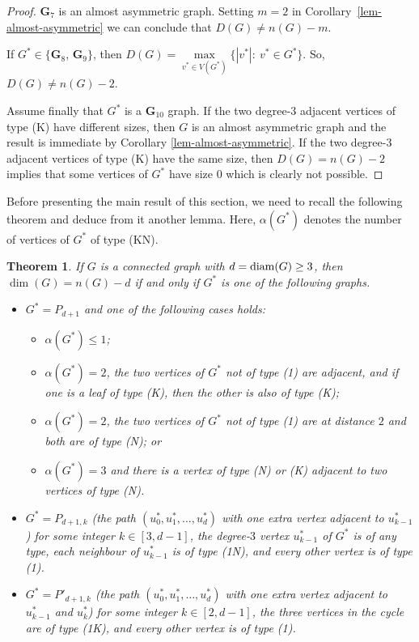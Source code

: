 \documentclass[12pt]{article}
\newtheorem{theorem}{Theorem}[section]
\DeclareMathOperator {\diam} {{\rm diam}}
\begin{document}
\begin{proof}
{\bf G}$_7$ is an almost asymmetric graph. Setting $m=2$ in Corollary~\ref{lem-almost-asymmetric} we can conclude that $D(G) \neq n(G)-m$. 

If $G^{\ast} \in \{${\bf G}$_8$, {\bf G}$_9\}$, then $D(G)= \max\limits_{v^{\ast} \in V(G^{\ast})} \{|v^{\ast}|:\ v^{\ast} \in G^{\ast} \}$. 
So, $D(G)\neq n(G)-2$. 

Assume finally that  $G^{\ast}$ is  a {\bf G}$_{10}$ graph.  If the two degree-$3$ adjacent vertices of type (K) have different sizes, then $G$ is an almost asymmetric graph and 
the result is immediate by Corollary \ref{lem-almost-asymmetric}. 
If the two degree-$3$ adjacent vertices of type (K) have the same size, then 
$D(G) = n(G)-2$ implies that some vertices of 
$G^{\ast}$ have size $0$ which is clearly not possible. 
\end{proof}

Before presenting the main result of this section, we need to recall the following theorem and deduce from it another lemma. Here, $\alpha(G^{\ast})$ denotes the number of vertices of $G^{\ast}$ of type (KN).

\begin{theorem} {\rm \cite[Theorem 2.14]{Hernando}}
\label{Hernando}
If $G$ is a connected graph with $d = \diam(G) \geq 3$, then $\dim(G) = n(G) - d$ if and only if $G^{\ast}$ is one of the following graphs.  
\begin{itemize}
\item[(a)] 
$G^{\ast}= P_{d+1}$ and one of the following cases holds: 
\begin{itemize} 
\item[(a1)] 
$\alpha(G^{\ast}) \leq 1$;
\item[(a2)]
$\alpha(G^{\ast}) = 2$, the two vertices of $G^{\ast}$ not of type (1) are adjacent, and if one is a leaf of type (K), then the other is also of type (K);
\item[(a3)] 
$\alpha(G^{\ast}) = 2$,
the two vertices of $G^{\ast}$ not of type (1) are at distance $2$ and both are
of type (N); or
\item[(a4)]
$\alpha(G^{\ast}) = 3$ and there is a vertex of type (N) or (K) adjacent to two vertices of type (N).
\end{itemize}

\item[(b)] 
$G^{\ast}= P_{d+1, k}$ (the path $(u^{\ast}_0, u^{\ast}_1, \ldots , u^{\ast}_d)$ with one extra vertex adjacent to $u^{\ast}_{k-1}$)
for some integer $k \in [3, d - 1]$, the degree-$3$ vertex $u^{\ast}_{k-1}$ of $G^{\ast}$ is of any type, each
neighbour of $u^{\ast}_{k-1}$ is of type (1N), and every other vertex is of type (1).

\item[(c)] 
$G^{\ast}= P'_{d+1, k}$ (the path $(u^{\ast}_0, u^{\ast}_1, \ldots , u^{\ast}_d)$ with one extra vertex adjacent to $u^{\ast}_{k-1}$ and 
$u^{\ast}_{k}$) for some integer $k \in [2, d - 1]$, the three vertices in the cycle are of type
(1K), and every other vertex is of type (1).
\end{itemize}
\end{theorem} 
\end{document}
